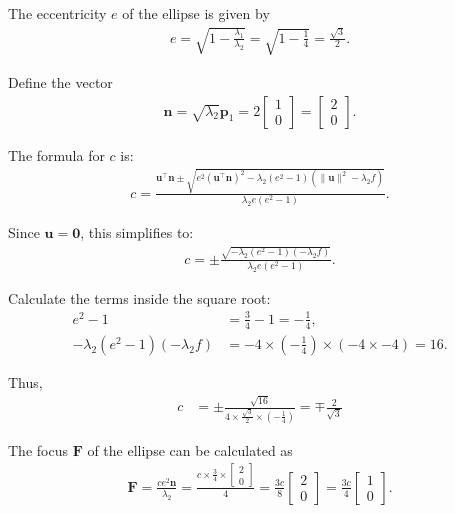 \documentclass[journal]{IEEEtran}
\begin{document}
The eccentricity $e$ of the ellipse is given by
\begin{align}
e = \sqrt{1 - \frac{\lambda_1}{\lambda_2}} = \sqrt{1 - \frac{1}{4}} = \frac{\sqrt{3}}{2}.
\end{align}

Define the vector
\begin{align}
\mathbf{n} = \sqrt{\lambda_2} \mathbf{p}_1 = 2 \begin{bmatrix} 1 \\ 0 \end{bmatrix} = \begin{bmatrix} 2 \\ 0 \end{bmatrix}.
\end{align}



The formula for $c$ is:
\begin{align}
c = \frac{ \mathbf{u}^\top \mathbf{n} \pm \sqrt{ e^2 (\mathbf{u}^\top \mathbf{n})^2 - \lambda_2 (e^2 - 1)( \|\mathbf{u}\|^2 - \lambda_2 f ) } }{ \lambda_2 e (e^2 - 1) }.
\end{align}

Since $\mathbf{u} = \mathbf{0}$, this simplifies to:
\begin{align}
c = \pm \frac{ \sqrt{ - \lambda_2 (e^2 - 1)( - \lambda_2 f ) } }{ \lambda_2 e (e^2 - 1) }.
\end{align}

Calculate the terms inside the square root:
\begin{align}
e^2 - 1 &= \frac{3}{4} - 1 = -\frac{1}{4}, \\
- \lambda_2 (e^2 - 1)( - \lambda_2 f ) &= -4 \times \left(-\frac{1}{4}\right) \times (-4 \times -4) = 16.
\end{align}

Thus,
\begin{align}
c &= \pm \frac{\sqrt{16}}{4 \times \frac{\sqrt{3}}{2} \times \left(-\frac{1}{4}\right)} = \mp \frac{2}{\sqrt{3}}
\end{align}


The focus $\mathbf{F}$ of the ellipse can be calculated as
\begin{align}
\mathbf{F} = \frac{c e^2 \mathbf{n}}{\lambda_2} = \frac{c \times \frac{3}{4} \times \begin{bmatrix} 2 \\ 0 \end{bmatrix}}{4} = \frac{3c}{8} \begin{bmatrix} 2 \\ 0 \end{bmatrix} = \frac{3c}{4} \begin{bmatrix} 1 \\ 0 \end{bmatrix}.
\end{align}
\end{document}
